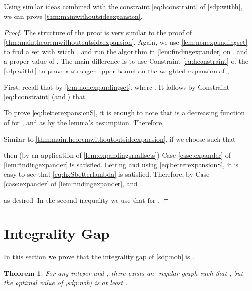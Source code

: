 \documentclass[11pt]{article}
\newtheorem{theorem}{Theorem}[section]
\begin{document}
Using similar ideas combined with the constraint \eqref{eq:hconstraint} of \ref{sdp:withh}, we can prove  \autoref{thm:mainwithoutsideexpansion}.

\thmmainnoexp*
\begin{proof}The structure of the proof is very similar to the proof of  
\autoref{thm:maintheoremwithoutoutsideexpansion}. Again, we use  
\autoref{lem:nonexpandingset} to find a set  with 
width , and run the algorithm in \autoref{lem:findingexpander} on  ,  and a proper value of 
. The main 
difference  is to use Constraint \eqref{eq:hconstraint} of 
the \ref{sdp:withh} to prove a stronger upper bound on the weighted expansion of , 

First, recall that by \autoref{lem:nonexpandingset}, 
where .
It follows by Constraint \eqref{eq:hconstraint} (and  ) that 

To prove \eqref{eq:betterexpansionS}, it is enough to note that  is a decreasing function of  for , and  as  by the lemma's assumption. Therefore, 

Similar to \autoref{thm:maintheoremwithoutoutsideexpansion}, if we choose  such that 

then (by an application of \autoref{lem:expandingsmallsets}) Case \ref{case:expander} of \autoref{lem:findingexpander} is satisfied.
Letting   
and using \eqref{eq:betterexpansionS}, it is easy to see that \eqref{eq:hxSbetterlambda} is satisfied. 
Therefore, by Case \ref{case:expander} of \autoref{lem:findingexpander},  and 

as desired. In the second inequality we use that  for .
\end{proof}


\section{Integrality Gap}
In this section we prove that the integrality gap of \ref{sdp:noh} is  . 
\begin{theorem}
\label{thm:IGfirst}
For any integer  and , there exists an -regular graph  such that  , but the optimal value of \ref{sdp:noh} is at least .
\end{theorem}
\end{document}

